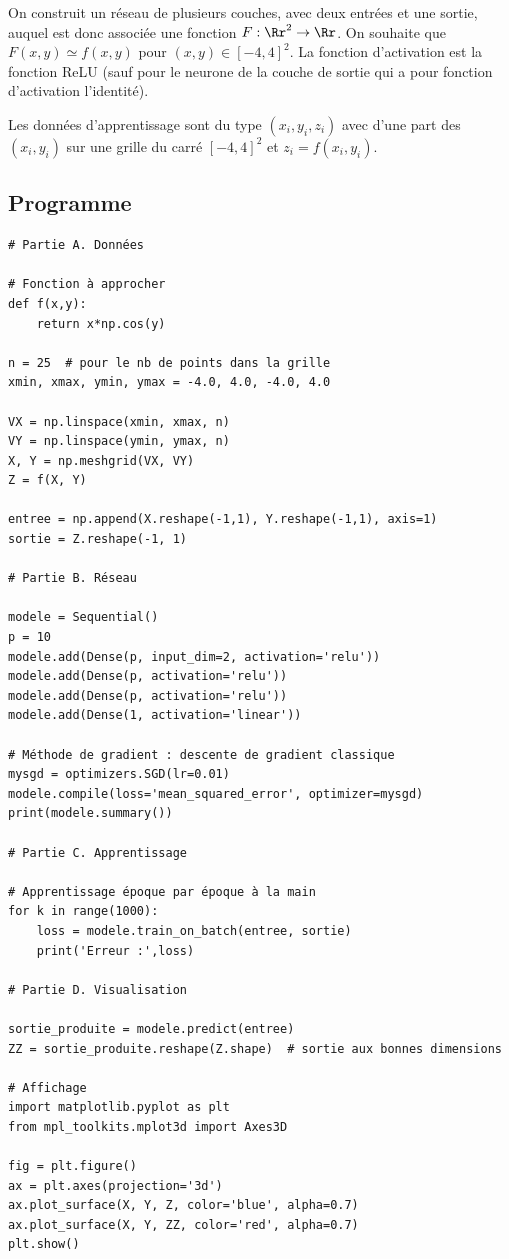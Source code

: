 \documentclass[11pt,class=report,crop=false]{standalone}
\begin{document}
On construit un réseau de plusieurs couches, avec deux entrées et une sortie, auquel est donc associée une fonction $F : \Rr^2 \to \Rr$. On souhaite que $F(x,y) \simeq f(x,y)$ 
pour $(x,y) \in [-4,4]^2$. La fonction d'activation est la fonction \og{}ReLU\fg{} (sauf pour le neurone de la couche de sortie qui a pour fonction d'activation l'identité).



Les données d'apprentissage sont du type $(x_i,y_i,z_i)$ avec d'une part des $(x_i,y_i)$ sur une grille du carré $[-4,4]^2$ et $z_i = f(x_i,y_i)$.


\subsection{Programme}

\begin{lstlisting}
# Partie A. Données

# Fonction à approcher
def f(x,y):
    return x*np.cos(y)

n = 25  # pour le nb de points dans la grille
xmin, xmax, ymin, ymax = -4.0, 4.0, -4.0, 4.0

VX = np.linspace(xmin, xmax, n)
VY = np.linspace(ymin, ymax, n)
X, Y = np.meshgrid(VX, VY)
Z = f(X, Y)

entree = np.append(X.reshape(-1,1), Y.reshape(-1,1), axis=1)
sortie = Z.reshape(-1, 1)

# Partie B. Réseau 

modele = Sequential()
p = 10
modele.add(Dense(p, input_dim=2, activation='relu'))
modele.add(Dense(p, activation='relu'))
modele.add(Dense(p, activation='relu'))
modele.add(Dense(1, activation='linear'))

# Méthode de gradient : descente de gradient classique
mysgd = optimizers.SGD(lr=0.01)
modele.compile(loss='mean_squared_error', optimizer=mysgd)
print(modele.summary())

# Partie C. Apprentissage

# Apprentissage époque par époque à la main
for k in range(1000):
    loss = modele.train_on_batch(entree, sortie)
    print('Erreur :',loss)

# Partie D. Visualisation

sortie_produite = modele.predict(entree)
ZZ = sortie_produite.reshape(Z.shape)  # sortie aux bonnes dimensions

# Affichage
import matplotlib.pyplot as plt
from mpl_toolkits.mplot3d import Axes3D

fig = plt.figure()
ax = plt.axes(projection='3d')
ax.plot_surface(X, Y, Z, color='blue', alpha=0.7)
ax.plot_surface(X, Y, ZZ, color='red', alpha=0.7)
plt.show()
\end{lstlisting}
\end{document}
